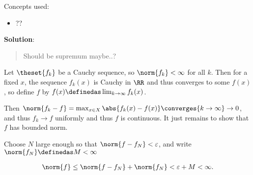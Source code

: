 \begin{solution}

Concepts used:

\begin{itemize}
\tightlist
\item
  ??
\end{itemize}

\textbf{Solution}:

\begin{quote}
Should be supremum maybe..?
\end{quote}

Let \(\theset{f_k}\) be a Cauchy sequence, so \(\norm{f_k} < \infty\)
for all \(k\). Then for a fixed \(x\), the sequence \(f_k(x)\) is Cauchy
in \(\RR\) and thus converges to some \(f(x)\), so define \(f\) by
\(f(x) \definedas \lim_{k\to\infty} f_k(x)\).

Then
\(\norm{f_k - f} = \max_{x\in X}\abs{f_k(x) - f(x)} \converges{k\to\infty}\to 0\),
and thus \(f_k \to f\) uniformly and thus \(f\) is continuous. It just
remains to show that \(f\) has bounded norm.

Choose \(N\) large enough so that \(\norm{f - f_N} < \varepsilon\), and
write \(\norm{f_N} \definedas M < \infty\)

\begin{align*}
\norm{f} \leq \norm{f - f_N} + \norm{f_N} < \varepsilon + M < \infty
.\end{align*}

\end{solution}





